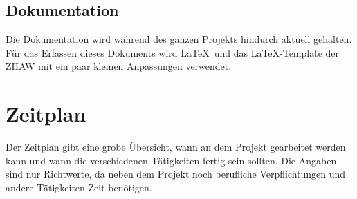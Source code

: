 \subsection{Dokumentation}\label{dokumentation}
Die Dokumentation wird während des ganzen Projekts hindurch aktuell gehalten. Für das Erfassen dieses Dokuments wird \LaTeX\ und das \LaTeX-Template der ZHAW \cite{zhaw_latex_template} mit ein 
paar kleinen Anpassungen verwendet.

\section{Zeitplan}\label{zeitplan}
Der Zeitplan gibt eine grobe Übersicht, wann an dem Projekt gearbeitet werden kann und wann die verschiedenen Tätigkeiten fertig sein sollten. Die Angaben sind nur Richtwerte, da neben dem 
Projekt noch berufliche Verpflichtungen und andere Tätigkeiten Zeit benötigen.

\newpage 

